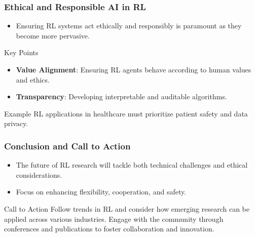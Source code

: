 \documentclass{beamer}
\begin{document}
\begin{frame}[fragile]
    \frametitle{Ethical and Responsible AI in RL}
    \begin{itemize}
        \item Ensuring RL systems act ethically and responsibly is paramount as they become more pervasive.
    \end{itemize}
    \begin{block}{Key Points}
        \begin{itemize}
            \item \textbf{Value Alignment}: Ensuring RL agents behave according to human values and ethics.
            \item \textbf{Transparency}: Developing interpretable and auditable algorithms.
        \end{itemize}
    \end{block}
    \begin{block}{Example}
        RL applications in healthcare must prioritize patient safety and data privacy.
    \end{block}
\end{frame}

\begin{frame}[fragile]
    \frametitle{Conclusion and Call to Action}
    \begin{itemize}
        \item The future of RL research will tackle both technical challenges and ethical considerations.
        \item Focus on enhancing flexibility, cooperation, and safety.
    \end{itemize}
    \begin{block}{Call to Action}
        Follow trends in RL and consider how emerging research can be applied across various industries. Engage with the community through conferences and publications to foster collaboration and innovation.
    \end{block}
\end{frame}
\end{document}
